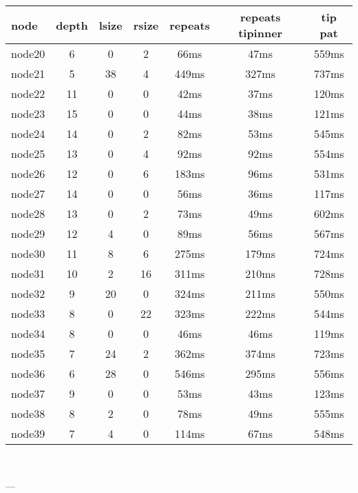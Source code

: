 \begin{tabular}{|l|c|c|c|c|c|c|}
\hline node & depth & lsize & rsize  & repeats & repeats tipinner & tip pat\\
    \hline node20 & 6 & 0 & 2 & 66ms & 47ms & 559ms\\
    \hline node21 & 5 & 38 & 4 & 449ms & 327ms & 737ms\\
    \hline node22 & 11 & 0 & 0 & 42ms & 37ms & 120ms\\
    \hline node23 & 15 & 0 & 0 & 44ms & 38ms & 121ms\\
    \hline node24 & 14 & 0 & 2 & 82ms & 53ms & 545ms\\
    \hline node25 & 13 & 0 & 4 & 92ms & 92ms & 554ms\\
    \hline node26 & 12 & 0 & 6 & 183ms & 96ms & 531ms\\
    \hline node27 & 14 & 0 & 0 & 56ms & 36ms & 117ms\\
    \hline node28 & 13 & 0 & 2 & 73ms & 49ms & 602ms\\
    \hline node29 & 12 & 4 & 0 & 89ms & 56ms & 567ms\\
    \hline node30 & 11 & 8 & 6 & 275ms & 179ms & 724ms\\
    \hline node31 & 10 & 2 & 16 & 311ms & 210ms & 728ms\\
    \hline node32 & 9 & 20 & 0 & 324ms & 211ms & 550ms\\
    \hline node33 & 8 & 0 & 22 & 323ms & 222ms & 544ms\\
    \hline node34 & 8 & 0 & 0 & 46ms & 46ms & 119ms\\
    \hline node35 & 7 & 24 & 2 & 362ms & 374ms & 723ms\\
    \hline node36 & 6 & 28 & 0 & 546ms & 295ms & 556ms\\
    \hline node37 & 9 & 0 & 0 & 53ms & 43ms & 123ms\\
    \hline node38 & 8 & 2 & 0 & 78ms & 49ms & 555ms\\
    \hline node39 & 7 & 4 & 0 & 114ms & 67ms & 548ms\\

\hline
\end{tabular} \

---


